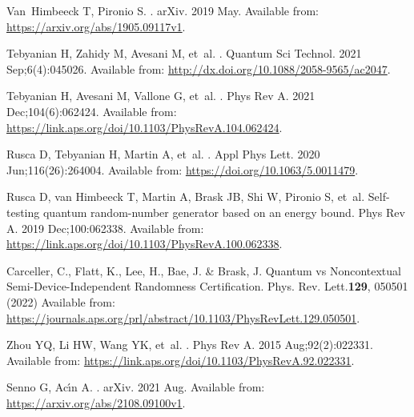\documentclass[]{interact}
\theoremstyle{plain}%
\theoremstyle{definition}
\theoremstyle{remark}
\begin{document}
\begin{thebibliography}{100}
Van~Himbeeck T, Pironio S.
.
\newblock arXiv. 2019 May.
\newblock Available from: \url{https://arxiv.org/abs/1905.09117v1}.

Tebyanian H, Zahidy M, Avesani M, et~al.
.
\newblock Quantum Sci Technol. 2021 Sep;6(4):045026.
\newblock Available from: \url{http://dx.doi.org/10.1088/2058-9565/ac2047}.

Tebyanian H, Avesani M, Vallone G, et~al.
.
\newblock Phys Rev A. 2021 Dec;104(6):062424.
\newblock Available from:
  \url{https://link.aps.org/doi/10.1103/PhysRevA.104.062424}.

Rusca D, Tebyanian H, Martin A, et~al.
.
\newblock Appl Phys Lett. 2020 Jun;116(26):264004.
\newblock Available from: \url{https://doi.org/10.1063/5.0011479}.

Rusca D, van Himbeeck T, Martin A, Brask JB, Shi W, Pironio S, et~al.
\newblock Self-testing quantum random-number generator based on an energy
  bound.
\newblock Phys Rev A. 2019 Dec;100:062338.
\newblock Available from:
  \url{https://link.aps.org/doi/10.1103/PhysRevA.100.062338}.


Carceller, C., Flatt, K., Lee, H., Bae, J. \& Brask, J. Quantum vs Noncontextual Semi-Device-Independent Randomness Certification. Phys. Rev. Lett.\textbf{129}, 050501 (2022)
\newblock Available from: \url{https://journals.aps.org/prl/abstract/10.1103/PhysRevLett.129.050501}.

Zhou YQ, Li HW, Wang YK, et~al.
.
\newblock Phys Rev A. 2015 Aug;92(2):022331.
\newblock Available from:
  \url{https://link.aps.org/doi/10.1103/PhysRevA.92.022331}.

Senno G, Ac{\ifmmode\acute{\imath}\else\'{\i}\fi}n A.
.
\newblock arXiv. 2021 Aug.
\newblock Available from: \url{https://arxiv.org/abs/2108.09100v1}.


\end{thebibliography}
\end{document}
